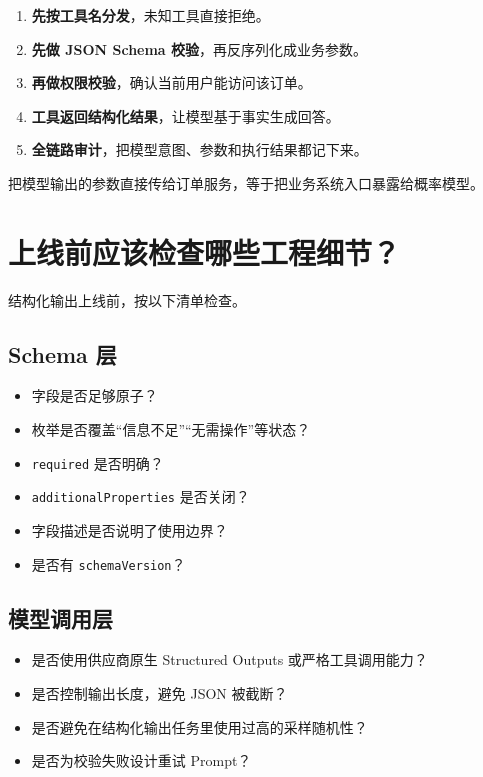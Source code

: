 \documentclass[9pt,a4paper,twocolumn]{ctexart}
\begin{document}
\begin{enumerate}[itemsep=1pt, topsep=2pt]
  \item \textbf{先按工具名分发}，未知工具直接拒绝。
  \item \textbf{先做 JSON Schema 校验}，再反序列化成业务参数。
  \item \textbf{再做权限校验}，确认当前用户能访问该订单。
  \item \textbf{工具返回结构化结果}，让模型基于事实生成回答。
  \item \textbf{全链路审计}，把模型意图、参数和执行结果都记下来。
\end{enumerate}


把模型输出的参数直接传给订单服务，等于把业务系统入口暴露给概率模型。



\section*{上线前应该检查哪些工程细节？}


结构化输出上线前，按以下清单检查。



\subsection*{Schema 层}

\begin{itemize}[itemsep=1pt, topsep=2pt]
  \item 字段是否足够原子？
  \item 枚举是否覆盖“信息不足”“无需操作”等状态？
  \item \texttt{required} 是否明确？
  \item \texttt{additionalProperties} 是否关闭？
  \item 字段描述是否说明了使用边界？
  \item 是否有 \texttt{schemaVersion}？
\end{itemize}


\subsection*{模型调用层}

\begin{itemize}[itemsep=1pt, topsep=2pt]
  \item 是否使用供应商原生 Structured Outputs 或严格工具调用能力？
  \item 是否控制输出长度，避免 JSON 被截断？
  \item 是否避免在结构化输出任务里使用过高的采样随机性？
  \item 是否为校验失败设计重试 Prompt？
\end{itemize}
\end{document}
